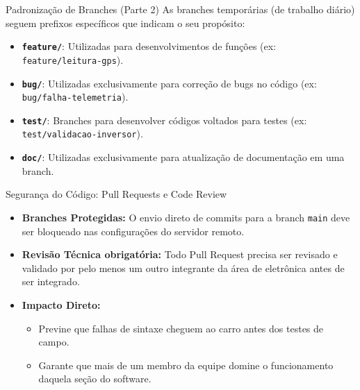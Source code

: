 \documentclass[10pt,aspectratio=169]{beamer}
\begin{document}
\begin{frame}{Padronização de Branches (Parte 2)}
    As branches temporárias (de trabalho diário) seguem prefixos específicos que indicam o seu propósito:
    \vspace{0.3cm}
    \begin{itemize}
        \item \textbf{\texttt{feature/}}: Utilizadas para desenvolvimentos de funções (ex: \texttt{feature/leitura-gps}).
        \item \textbf{\texttt{bug/}}: Utilizadas exclusivamente para correção de bugs no código (ex: \texttt{bug/falha-telemetria}).
        \item \textbf{\texttt{test/}}: Branches para desenvolver códigos voltados para testes (ex: \texttt{test/validacao-inversor}).
        \item \textbf{\texttt{doc/}}: Utilizadas exclusivamente para atualização de documentação em uma branch.
    \end{itemize}
\end{frame}

\begin{frame}{Segurança do Código: Pull Requests e Code Review}
    \begin{itemize}
        \item \textbf{Branches Protegidas:} O envio direto de commits para a branch \texttt{main} deve ser bloqueado nas configurações do servidor remoto.
        \item \textbf{Revisão Técnica obrigatória:} Todo Pull Request precisa ser revisado e validado por pelo menos um outro integrante da área de eletrônica antes de ser integrado.
        \item \textbf{Impacto Direto:}
        \begin{itemize}
            \item Previne que falhas de sintaxe cheguem ao carro antes dos testes de campo.
            \item Garante que mais de um membro da equipe domine o funcionamento daquela seção do software.
        \end{itemize}
    \end{itemize}
\end{frame}
\end{document}
